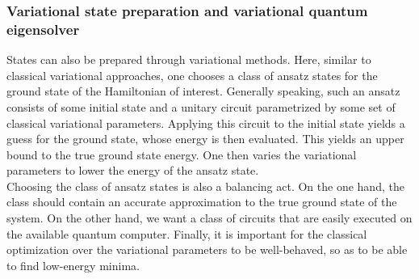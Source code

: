 \documentclass{book}
\theoremstyle{definition}
\begin{document}
\subsubsection{Variational state preparation and variational quantum eigensolver}


States can also be prepared through variational methods. Here, similar to classical variational approaches, one chooses a class of ansatz states for the ground state of the Hamiltonian of interest. Generally speaking, such an ansatz consists of some initial state and a unitary circuit parametrized by some set of classical variational parameters. Applying this circuit to the initial state
yields a guess for the ground state, whose energy is then evaluated. This yields an upper bound to the true ground state
energy. One then varies the variational parameters to lower
the energy of the ansatz state.\\

Choosing the class of ansatz states is also a balancing act. On the one hand, the class should contain an accurate approximation to the true ground state of the system. On the other hand, we want a class of circuits that are easily executed on the available quantum computer. Finally, it
is important for the classical optimization over the variational
parameters to be well-behaved, so as to be able to find low-energy minima. 
\end{document}
